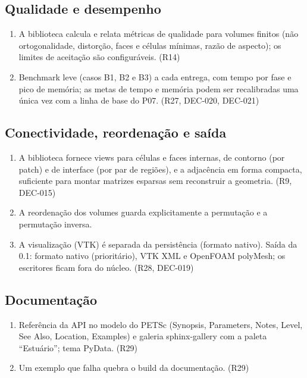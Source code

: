 \subsection{Qualidade e desempenho}

\begin{enumerate}
  \item A biblioteca calcula e relata métricas de qualidade para volumes finitos (não ortogonalidade, distorção,
        faces e células mínimas, razão de aspecto); os limites de aceitação são configuráveis. (R14)
  \item Benchmark leve (casos B1, B2 e B3) a cada entrega, com tempo por fase e pico de memória; as metas de
        tempo e memória podem ser recalibradas uma única vez com a linha de base do P07. (R27, DEC-020, DEC-021)
\end{enumerate}

\subsection{Conectividade, reordenação e saída}

\begin{enumerate}
  \item A biblioteca fornece views para células e faces internas, de contorno (por patch) e de interface (por par
        de regiões), e a adjacência em forma compacta, suficiente para montar matrizes esparsas sem reconstruir a
        geometria. (R9, DEC-015)
  \item A reordenação dos volumes guarda explicitamente a permutação e a permutação inversa.
  \item A visualização (VTK) é separada da persistência (formato nativo). Saída da 0.1: formato nativo
        (prioritário), VTK XML e OpenFOAM polyMesh; os escritores ficam fora do núcleo. (R28, DEC-019)
\end{enumerate}

\subsection{Documentação}

\begin{enumerate}
  \item Referência da API no modelo do PETSc (Synopsis, Parameters, Notes, Level, See Also, Location, Examples)
        e galeria sphinx-gallery com a paleta ``Estuário''; tema PyData. (R29)
  \item Um exemplo que falha quebra o build da documentação. (R29)
\end{enumerate}

